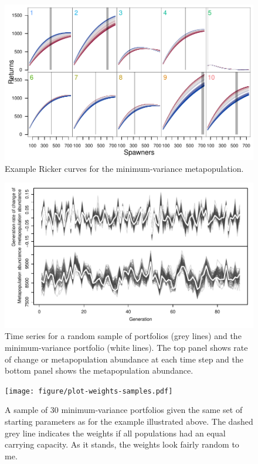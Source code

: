 \documentclass[12pt]{article}
\begin{document}
\begin{figure}[htbp]
\centering
\includegraphics{figure/unnamed-chunk-1.pdf}
\caption{Example Ricker curves for the minimum-variance metapopulation.}
\end{figure}

\begin{figure}[htbp]
\centering
\includegraphics{figure/plot-portfolio-timeseries.pdf}
\caption{Time series for a random sample of portfolios (grey lines) and
the minimum-variance portfolio (white lines). The top panel shows rate
of change or metapopulation abundance at each time step and the bottom
panel shows the metapopulation abundance.}
\end{figure}

\begin{figure}[htbp]
\centering
\texttt{[image: figure/plot-weights-samples.pdf]}
\caption{A sample of 30 minimum-variance portfolios given the same set
of starting parameters as for the example illustrated above. The dashed
grey line indicates the weights if all populations had an equal carrying
capacity. As it stands, the weights look fairly random to me.}
\end{figure}
\end{document}
